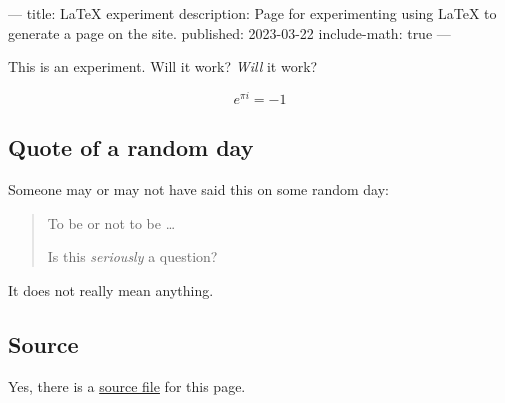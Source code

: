 ---
title: LaTeX experiment
description: Page for experimenting using LaTeX to generate a page on the site.
published: 2023-03-22
include-math: true
---
\usepackage{hyperref}

This is an experiment.  Will it work?  \emph{Will} it work?

\[ e^{\pi i} = -1 \]

\subsection{Quote of a random day}

Someone may or may not have said this on some random day:

\begin{quote}
  To be or not to be \ldots

  Is this \emph{seriously} a question?
\end{quote}

It does not really mean anything.

\subsection{Source}

Yes, there is a \href{https://github.com/chungyc/site-personal/tree/main/site/article/technical/website/experiments/latex.tex}{source file}
for this page.
